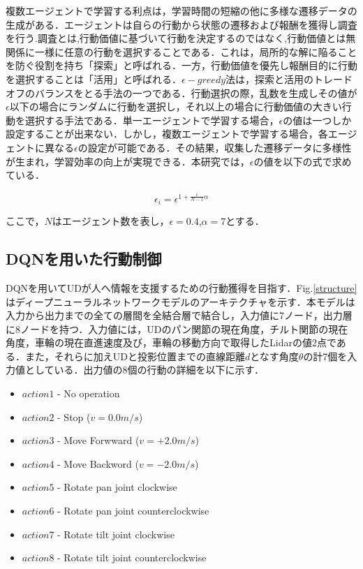 \documentclass[12pt]{sonota/aislab}
\begin{document}
複数エージェントで学習する利点は，学習時間の短縮の他に多様な遷移データの生成がある．エージェントは自らの行動から状態の遷移および報酬を獲得し調査を行う.調査とは,行動価値に基づいて行動を決定するのではなく,行動価値とは無関係に一様に任意の行動を選択することである．これは，局所的な解に陥ることを防ぐ役割を持ち「探索」と呼ばれる．一方，行動価値を優先し報酬目的に行動を選択することは「活用」と呼ばれる．$\epsilon-greedy$法は，探索と活用のトレードオフのバランスをとる手法の一つである．行動選択の際，乱数を生成しその値が$\epsilon$以下の場合にランダムに行動を選択し，それ以上の場合に行動価値の大きい行動を選択する手法である．単一エージェントで学習する場合，$\epsilon$の値は一つしか設定することが出来ない．しかし，複数エージェントで学習する場合，各エージェントに異なる$\epsilon$の設定が可能である．その結果，収集した遷移データに多様性が生まれ，学習効率の向上が実現できる．本研究では，$\epsilon$の値を以下の式で求めている．

\begin{equation}
\label{sum_P_i}
  \epsilon_{i}=\epsilon^{1+\frac{i}{N-1}\alpha}
\end{equation}

ここで，$N$はエージェント数を表し，$\epsilon=0.4$,$\alpha=7$とする．

\subsection{DQNを用いた行動制御}
DQNを用いてUDが人へ情報を支援するための行動獲得を目指す．Fig.\ref{structure}はディープニューラルネットワークモデルのアーキテクチャを示す．本モデルは入力から出力までの全ての層間を全結合層で結合し，入力値に7ノード，出力層に8ノードを持つ．入力値には，UDのパン関節の現在角度，チルト関節の現在角度，車輪の現在直進速度及び，車輪の移動方向で取得したLidarの値2点である．また，それらに加えUDと投影位置までの直線距離$d$となす角度$\theta$の計7個を入力値としている．出力値の8個の行動の詳細を以下に示す．

\begin{itemize}
    \item $action1$ - No operation 
    \item $action2$ - Stop ($v = 0.0 m/s$)
    \item $action3$ - Move Forwward ($v = +2.0 m/s$)
    \item $action4$ - Move Backword ($v = -2.0 m/s$)
    \item $action5$ - Rotate pan joint clockwise
    \item $action6$ - Rotate pan joint counterclockwise
    \item $action7$ - Rotate tilt joint clockwise 
    \item $action8$ - Rotate tilt joint counterclockwise
\end{itemize}
\end{document}
